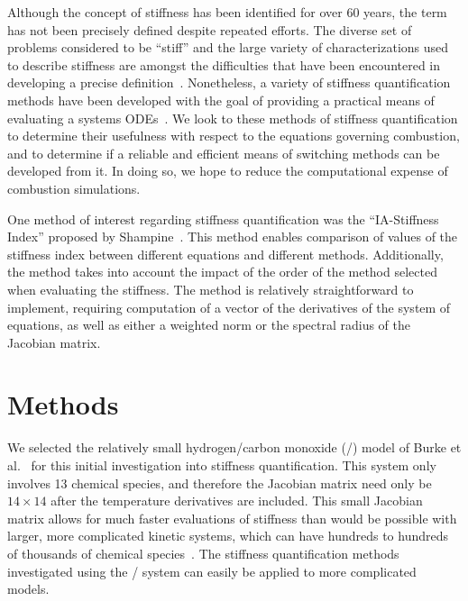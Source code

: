 \documentclass[12pt]{ussci}
\begin{document}
Although the concept of stiffness has been identified for over 60 years, the term has not been precisely defined despite repeated efforts. The diverse set of problems considered to be ``stiff'' and the large variety of characterizations used to describe stiffness are amongst the difficulties that have been encountered in developing a precise definition~\cite{Soderlind2014}. Nonetheless, a variety of stiffness quantification methods have been developed with the goal of providing a practical means of evaluating a systems ODEs~\cite{Soderlind2014,Shampine1985,Brugnano2011,Lambert1973ComputationalEquations,Hairer1996SolvingII}. We look to these methods of stiffness quantification to determine their usefulness with respect to the equations governing combustion, and to determine if a reliable and efficient means of switching methods can be developed from it. In doing so, we hope to reduce the computational expense of combustion simulations.

One method of interest regarding stiffness quantification was the ``IA-Stiffness Index'' proposed by Shampine~\cite{Shampine1982}. This method enables comparison of values of the stiffness index between different equations and different methods. Additionally, the method takes into account the impact of the order of the method selected when evaluating the stiffness. The method is relatively straightforward to implement, requiring computation of a vector of the derivatives of the system of equations, as well as either a weighted norm or the spectral radius of the Jacobian matrix.

\section{Methods}

We selected the relatively small hydrogen\slash carbon monoxide (\slash {}) model of Burke et al.~\cite{Burke:2011fh} for this initial investigation into stiffness quantification. This system only involves 13 chemical species, and therefore the Jacobian matrix need only be $14\times14$ after the temperature derivatives are included. This small Jacobian matrix allows for much faster evaluations of stiffness than would be possible with larger, more complicated kinetic systems, which can have hundreds to hundreds of thousands of chemical species~\cite{Niemeyer:2013}. The stiffness quantification methods investigated using the \slash {} system can easily be applied to more complicated models.
\end{document}
